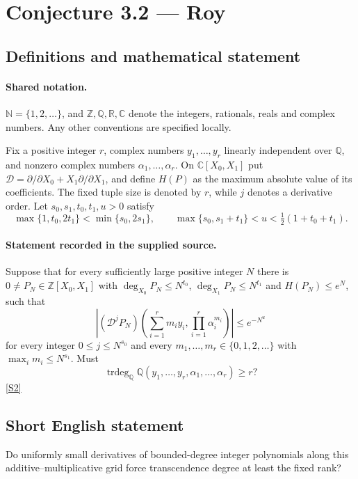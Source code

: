 \documentclass[11pt]{article}
\newcommand{\sref}[2]{\hyperlink{source:#1:#2}{[S#2]}}
\begin{document}
\section{Conjecture 3.2 — Roy}\label{statement}

\subsection{Definitions and mathematical statement}

\paragraph{Shared notation.}$\mathbb N=\{1,2,\ldots\}$, and $\mathbb Z,\mathbb Q,\mathbb R,\mathbb C$ denote the integers, rationals, reals and complex numbers. Any other conventions are specified locally.


Fix a positive integer $r$, complex numbers $y_1,\ldots,y_r$ linearly independent over $\mathbb Q$, and nonzero complex numbers $\alpha_1,\ldots,\alpha_r$. On $\mathbb C[X_0,X_1]$ put $\mathcal D=\partial/\partial X_0+X_1\partial/\partial X_1$, and define $H(P)$ as the maximum absolute value of its coefficients. The fixed tuple size is denoted by $r$, while $j$ denotes a derivative order. Let $s_0,s_1,t_0,t_1,u>0$ satisfy \[\max\{1,t_0,2t_1\}<\min\{s_0,2s_1\},\qquad \max\{s_0,s_1+t_1\}<u<\tfrac12(1+t_0+t_1).\]
\paragraph{Statement recorded in the supplied source.}
Suppose that for every sufficiently large positive integer $N$ there is $0\ne P_N\in\mathbb Z[X_0,X_1]$ with $\deg_{X_0}P_N\le N^{t_0}$, $\deg_{X_1}P_N\le N^{t_1}$ and $H(P_N)\le e^N$, such that \[\left|(\mathcal D^jP_N)\left(\sum_{i=1}^r m_i y_i,\prod_{i=1}^r\alpha_i^{m_i}\right)\right|\le e^{-N^u}\] for every integer $0\le j\le N^{s_0}$ and every $m_1,\ldots,m_r\in\{0,1,2,\ldots\}$ with $\max_i m_i\le N^{s_1}$. Must \[\operatorname{trdeg}_{\mathbb Q}\mathbb Q(y_1,\ldots,y_r,\alpha_1,\ldots,\alpha_r)\ge r?\] \sref{statement}{2}
\subsection{Short English statement}
Do uniformly small derivatives of bounded-degree integer polynomials along this additive–multiplicative grid force transcendence degree at least the fixed rank?
\end{document}
